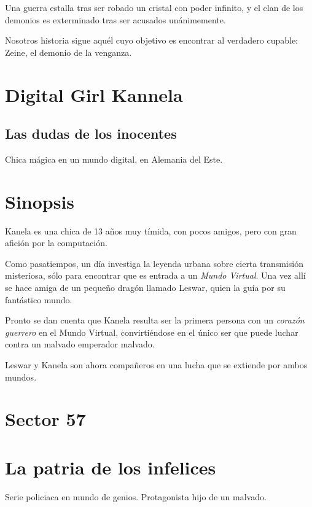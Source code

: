 \documentclass[letterpaper,12pt]{article}
\begin{document}
	Una guerra estalla tras ser robado un cristal con poder infinito, y el clan de los demonios es exterminado
	tras ser acusados unánimemente.
	
	Nosotros historia sigue aquél cuyo objetivo es encontrar al verdadero cupable: Zeine, el demonio de la
	venganza.
	
	\newpage
	
	\section*{Digital Girl Kannela}
	
	\subsection*{Las dudas de los inocentes}
	
	Chica mágica en un mundo digital, en Alemania del Este.
	
	\section*{Sinopsis}
	
	Kanela es una chica de 13 años muy tímida, con pocos amigos, pero con gran afición por la computación. 
	
	Como pasatiempos, un día investiga la leyenda urbana sobre cierta transmisión misteriosa, sólo para
	encontrar que es entrada a un \textit{Mundo Virtual}. Una vez allí se hace amiga de un pequeño dragón
	llamado Leswar, quien la guía por su fantástico mundo.
	
	Pronto se dan cuenta que Kanela resulta ser la primera persona con un
	\textit{corazón guerrero} en el Mundo Virtual, convirtiéndose en el único ser que puede luchar 
	contra un malvado emperador malvado.
	
	Leswar y Kanela son ahora compañeros en una lucha que se extiende por ambos mundos.
	
	\newpage
	
	\section*{Sector 57}
	
	\section*{La patria de los infelices}
	
	Serie policiaca en mundo de genios. Protagonista hijo de un malvado.
	
\end{document}

